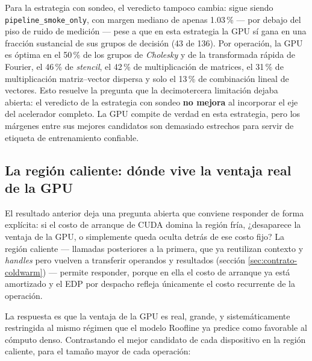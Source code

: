 \documentclass[12pt,oneside,spanish]{book}
\begin{document}
Para la estrategia con sondeo, el veredicto tampoco cambia: sigue siendo \texttt{pipeline\_smoke\_only}, con margen mediano de apenas 1.03\,\% --- por debajo del piso de ruido de medición --- pese a que en esta estrategia la GPU sí gana en una fracción sustancial de sus grupos de decisión (43 de 136). Por operación, la GPU es óptima en el 50\,\% de los grupos de \textit{Cholesky} y de la transformada rápida de Fourier, el 46\,\% de \textit{stencil}, el 42\,\% de multiplicación de matrices, el 31\,\% de multiplicación matriz--vector dispersa y solo el 13\,\% de combinación lineal de vectores. Esto resuelve la pregunta que la decimotercera limitación dejaba abierta: el veredicto de la estrategia con sondeo \textbf{no mejora} al incorporar el eje del acelerador completo. La GPU compite de verdad en esta estrategia, pero los márgenes entre sus mejores candidatos son demasiado estrechos para servir de etiqueta de entrenamiento confiable.

\subsection{La región caliente: dónde vive la ventaja real de la GPU}
\label{sec:resultados-warm-gpu}

El resultado anterior deja una pregunta abierta que conviene responder de forma explícita: si el costo de arranque de CUDA domina la región fría, ¿desaparece la ventaja de la GPU, o simplemente queda oculta detrás de ese costo fijo? La región caliente --- llamadas posteriores a la primera, que ya reutilizan contexto y \textit{handles} pero vuelven a transferir operandos y resultados (sección \ref{sec:contrato-coldwarm}) --- permite responder, porque en ella el costo de arranque ya está amortizado y el EDP por despacho refleja únicamente el costo recurrente de la operación.

La respuesta es que la ventaja de la GPU es real, grande, y sistemáticamente restringida al mismo régimen que el modelo Roofline ya predice como favorable al cómputo denso. Contrastando el mejor candidato de cada dispositivo en la región caliente, para el tamaño mayor de cada operación:
\end{document}
